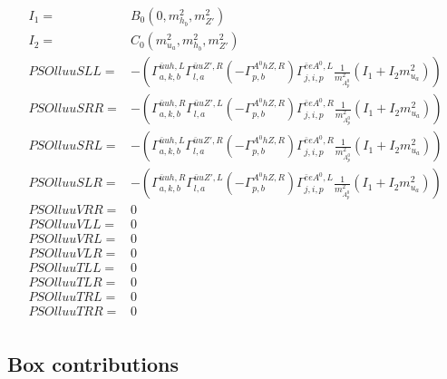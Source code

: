 \documentclass[A4,landscape]{article}
\begin{document}
\begin{align} 
I_1= & B_0(0, m^2_{h_{{b}}}, m^2_{{Z'}}) \\ 
I_2= & C_0(m^2_{u_{{a}}}, m^2_{h_{{b}}}, m^2_{{Z'}}) \\ 
  PSOlluuSLL= & -( \Gamma^{\bar{u}u h ,L}_{a, k, b} \Gamma^{\bar{u}u {Z'} ,R}_{l, a} (- \Gamma^{A^0 h Z ,R} _{p, b}) \Gamma^{\bar{e}e A^0 ,L}_{j, i, p} \frac{1}{m^2_{A^0_{{p}}}} (I_1 + I_2 m^2_{u_{{a}}})) \\ 
  PSOlluuSRR= & -( \Gamma^{\bar{u}u h ,R}_{a, k, b} \Gamma^{\bar{u}u {Z'} ,L}_{l, a} (- \Gamma^{A^0 h Z ,R} _{p, b}) \Gamma^{\bar{e}e A^0 ,R}_{j, i, p} \frac{1}{m^2_{A^0_{{p}}}} (I_1 + I_2 m^2_{u_{{a}}})) \\ 
  PSOlluuSRL= & -( \Gamma^{\bar{u}u h ,L}_{a, k, b} \Gamma^{\bar{u}u {Z'} ,R}_{l, a} (- \Gamma^{A^0 h Z ,R} _{p, b}) \Gamma^{\bar{e}e A^0 ,R}_{j, i, p} \frac{1}{m^2_{A^0_{{p}}}} (I_1 + I_2 m^2_{u_{{a}}})) \\ 
  PSOlluuSLR= & -( \Gamma^{\bar{u}u h ,R}_{a, k, b} \Gamma^{\bar{u}u {Z'} ,L}_{l, a} (- \Gamma^{A^0 h Z ,R} _{p, b}) \Gamma^{\bar{e}e A^0 ,L}_{j, i, p} \frac{1}{m^2_{A^0_{{p}}}} (I_1 + I_2 m^2_{u_{{a}}})) \\ 
  PSOlluuVRR= & 0 \\ 
  PSOlluuVLL= & 0 \\ 
  PSOlluuVRL= & 0 \\ 
  PSOlluuVLR= & 0 \\ 
  PSOlluuTLL= & 0 \\ 
  PSOlluuTLR= & 0 \\ 
  PSOlluuTRL= & 0 \\ 
  PSOlluuTRR= & 0 \\ 
\end{align} 
\subsection{Box contributions} 
\end{document}
